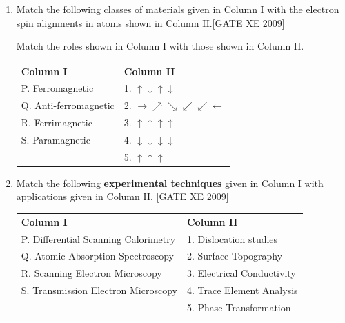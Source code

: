 \documentclass[journal,12pt,onecolumn]{IEEEtran}
\theoremstyle{remark}
\begin{document}
\begin{enumerate}
\item  Match the following classes of materials given in Column I with the electron spin alignments in atoms shown in Column II.\hfill[GATE XE 2009]



\noindent
Match the roles shown in Column I with those shown in Column II.

\begin{tabular}{@{}p{}p{}@{}}
\textbf{Column I} & \textbf{Column II} \\
P. Ferromagnetic & 1. $\uparrow\downarrow\uparrow\downarrow$ \\
Q. Anti-ferromagnetic & 2. $\rightarrow \nearrow \searrow\swarrow\swarrow \leftarrow$ \\
R. Ferrimagnetic & 3. $\uparrow\uparrow\uparrow\uparrow$ \\
S. Paramagnetic & 4. $\downarrow\downarrow\downarrow\downarrow$ \\
& 5. $\uparrow\uparrow\uparrow$ \\
\end{tabular}



\begin{enumerate}
\end{enumerate}



\item Match the following \textbf{experimental techniques} given in Column I with applications given in Column II.
\hfill[GATE XE 2009]


\begin{tabular}{p{7cm} p{6cm}}
\textbf{Column I} & \textbf{Column II} \\
P. Differential Scanning Calorimetry & 1. Dislocation studies \\
Q. Atomic Absorption Spectroscopy & 2. Surface Topography \\
R. Scanning Electron Microscopy & 3. Electrical Conductivity \\
S. Transmission Electron Microscopy & 4. Trace Element Analysis \\
& 5. Phase Transformation \\
\end{tabular}




\end{enumerate}
\end{document}
